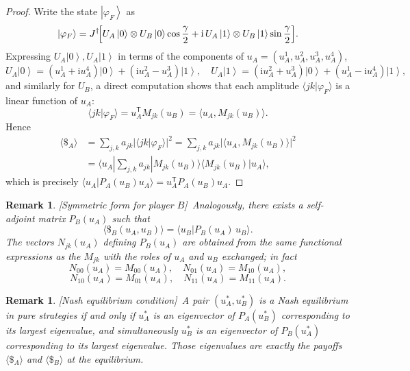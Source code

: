 \documentclass[11pt,a4paper,twoside]{article}
\newcommand{\mi}{\mathrm{i}} %
\newcommand{\ket}[1]{\left| #1 \right\rangle} %
\newcommand{\scalar}[2]{\langle #1 | #2\rangle} %
\newtheorem{rem}[definition]{Remark}
\newenvironment{remark}{\begin{rem}  \rm }{\end{rem}}
\begin{document}
\begin{proof}
Write the state $\ket{\varphi_F}$ as
\[
\ket{\varphi_F}=J^{\dagger}\!\Bigl[U_A\ket{0}\otimes U_B\ket{0}\cos\frac\gamma2
+\mi\,U_A\ket{1}\otimes U_B\ket{1}\sin\frac\gamma2\Bigr].
\]
Expressing \(U_A\ket{0},U_A\ket{1}\) in terms of the components of \(u_A=(u_A^1,u_A^2,u_A^3,u_A^4)\),
\[
U_A\ket{0}=(u_A^1+\mi u_A^4)\ket{0}+(\mi u_A^2-u_A^3)\ket{1},\quad
U_A\ket{1}=(\mi u_A^2+u_A^3)\ket{0}+(u_A^1-\mi u_A^4)\ket{1},
\]
and similarly for \(U_B\), a direct computation shows that each amplitude  \(\langle jk|\varphi_F\rangle\) is a linear function of \(u_A\):
\[
\langle jk|\varphi_F\rangle= u_A^{\mathsf T}M_{jk}(u_B)=\langle u_A,M_{jk}(u_B)\rangle.
\]
Hence
\begin{align*}
\langle\$_A\rangle&=\sum_{j,k}a_{jk}|\langle jk|\varphi_F\rangle|^2
      =\sum_{j,k}a_{jk}\bigl|\langle u_A,M_{jk}(u_B)\rangle\bigr|^2\\
      &=\scalar{u_A}{\!\sum_{j,k}a_{jk}|M_{jk}(u_B)\rangle\langle M_{jk}(u_B)|u_A},
\end{align*}
which is precisely \(\scalar{u_A}{P_A(u_B)u_A}=u_A^{\mathsf T}P_A(u_B)u_A\).
\end{proof}

\begin{remark}[Symmetric form for player $B$]\rm\,
Analogously, there exists a self-adjoint matrix \(P_B(u_A)\) such that
\[
\langle\$_B(u_A,u_B)\rangle = \scalar{u_B}{P_B(u_A)\,u_B}.
\]
The vectors \(N_{jk}(u_A)\) defining \(P_B(u_A)\) are obtained from the same functional expressions as the \(M_{jk}\) with the roles of \(u_A\) and \(u_B\) exchanged; in fact
\begin{equation}\label{N00_M00}
N_{00}(u_A)=M_{00}(u_A),\quad N_{01}(u_A)=M_{10}(u_A),
\end{equation}
\begin{equation}\label{N11_M11}
N_{10}(u_A)=M_{01}(u_A),\quad N_{11}(u_A)=M_{11}(u_A).
\end{equation}
\end{remark}

\begin{remark}[Nash equilibrium condition]\rm\,
A pair \((u_A^*,u_B^*)\) is a Nash equilibrium in pure strategies if and only if
\(u_A^*\) is an eigenvector of \(P_A(u_B^*)\) corresponding to its largest eigenvalue,
and simultaneously \(u_B^*\) is an eigenvector of \(P_B(u_A^*)\) corresponding to its largest eigenvalue.
Those eigenvalues are exactly the payoffs \(\langle\$_A\rangle\) and \(\langle\$_B\rangle\) at the equilibrium.
\end{remark}
\end{document}
